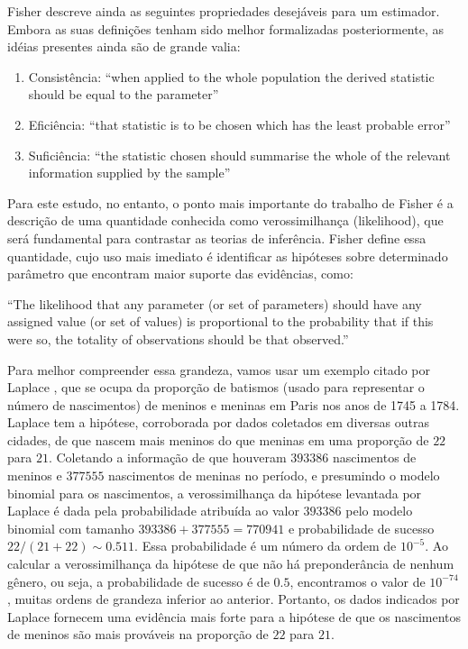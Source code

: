 Fisher descreve ainda as seguintes propriedades desejáveis para um estimador. Embora as suas definições tenham sido
melhor formalizadas posteriormente, as idéias presentes ainda são de grande valia:
\begin{enumerate}
	\item Consistência: ``when applied to the whole population the derived statistic should be equal to the parameter''
	\item Eficiência: ``that statistic is to be chosen which has the least probable error''
	\item Suficiência: ``the statistic chosen should summarise the whole of the relevant information supplied by the sample''
\end{enumerate}

Para este estudo, no entanto, o ponto mais importante do trabalho de Fisher é a descrição de uma quantidade conhecida como
verossimilhança (likelihood), que será fundamental para contrastar as teorias de inferência. Fisher define essa quantidade,
cujo uso mais imediato é identificar as hipóteses sobre determinado parâmetro que encontram maior suporte das evidências,
como:

``The likelihood that any parameter (or set of parameters) should have
any assigned value (or set of values) is proportional to the probability
that if this were so, the totality of observations should be that observed.''\cite{Fisher1922}

Para melhor compreender essa grandeza, vamos usar um exemplo citado por Laplace \cite{Laplace1814}, que se ocupa da 
proporção de batismos (usado para representar o número de nascimentos) de meninos e meninas em Paris nos anos 
de 1745 a 1784. Laplace tem a hipótese, corroborada por dados coletados em diversas outras cidades, de que nascem mais meninos
do que meninas em uma proporção de $22$ para $21$. Coletando a informação de que houveram $393386$ nascimentos de 
meninos e $377555$
nascimentos de meninas no período, e presumindo o modelo binomial para os nascimentos, a verossimilhança da hipótese levantada
por Laplace é dada pela probabilidade atribuída ao valor $393386$ pelo modelo binomial com tamanho $393386 + 377555 = 770941$
e probabilidade de sucesso $22/(21+22) \sim 0.511$. Essa probabilidade é um número da ordem de $10^{-5}$. Ao calcular a 
verossimilhança da hipótese de que não há preponderância de nenhum gênero, ou seja, a probabilidade de sucesso é de $0.5$, 
encontramos o valor de $10^{-74}$, muitas ordens de grandeza inferior ao anterior. Portanto, os dados indicados por Laplace
fornecem uma evidência mais forte para a hipótese de que os nascimentos de meninos são mais prováveis na proporção de $22$
para $21$.

